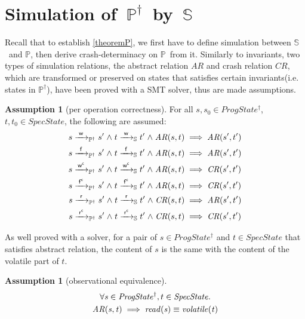 \documentclass[letterpaper,twocolumn,10pt]{article}
\theoremstyle{definition}
\newtheorem{assumption}[theorem]{Assumption}
\newcommand{\conj}{\mathrel\land}
\newcommand{\awa}[2]{\hphantom{#1}\mathclap{#2}\hphantom{#1}} %
\renewcommand{\i}[1]{\ensuremath{\mathit{#1}}}
\newcommand{\Spec}{\ensuremath{\mathbb S}}
\newcommand{\Prog}{\ensuremath{\mathbb P}}
\newcommand{\ProgInv}{\ensuremath{\mathbb P^\dagger}}
\newcommand{\actw}{\mathsf w}
\newcommand{\actwc}{\mathsf w^\mathsf{c}}
\newcommand{\actf}{\mathsf f}
\newcommand{\actr}{\mathsf r}
\newcommand{\actfc}{\mathsf{f^c}}
\newcommand{\actrc}{\mathsf{r^c}}
\newcommand{\ttIn}[2]{\xrightarrow{#1}_{#2}}
\newcommand{\ttS}[1]{\ttIn{#1}{\Spec}}
\newcommand{\ttPI}[1]{\ttIn{#1}{\ProgInv}}
\begin{document}
\section{Simulation of~\ProgInv\ by~\Spec}
\label{sec:sim}
Recall that to establish \cref{theoremP}, we first have to define simulation between \Spec\ and \Prog, then derive crash-determinacy on \Prog\ from it. Similarly to invariants, two types of simulation relations, the abstract relation $\i{AR}$ and crash relation $\i{CR}$, which are transformed or preserved on states that satisfies certain invariants(i.e. states in \ProgInv), have been proved with a SMT solver, thus are made assumptions.
\begin{assumption}[per operation correctness]
	For all $s, s_0 \in \i{ProgState^\dagger}$, $t, t_0 \in \i{SpecState}$, the following are assumed:
\begin{align*}
s \ttPI{\awa{\actw}{\actw }} s' \conj t \ttS{\awa{\actw}{\actw }} t' \conj \i{AR}(s, t) &\implies \i{AR}(s', t')\\
s \ttPI{\awa{\actw}{\actf }} s' \conj t \ttS{\awa{\actw}{\actf }} t' \conj \i{AR}(s, t) &\implies \i{AR}(s', t')\\
s \ttPI{\awa{\actw}{\actwc}} s' \conj t \ttS{\awa{\actw}{\actwc}} t' \conj \i{AR}(s, t) &\implies \i{CR}(s', t')\\
s \ttPI{\awa{\actw}{\actfc}} s' \conj t \ttS{\awa{\actw}{\actfc}} t' \conj \i{AR}(s, t) &\implies \i{CR}(s', t')\\
s \ttPI{\awa{\actw}{\actr }} s' \conj t \ttS{\awa{\actw}{\actr }} t' \conj \i{CR}(s, t) &\implies \i{AR}(s', t')\\
s \ttPI{\awa{\actw}{\actrc}} s' \conj t \ttS{\awa{\actw}{\actrc}} t' \conj \i{CR}(s, t) &\implies \i{CR}(s', t')
\end{align*}
\end{assumption}
As well proved with a solver, for a pair of \i{s \in ProgState^\dagger} and \i{t \in SpecState} that satisfies abstract relation, the content of $s$ is the same with the content of the volatile part of $t$.
\begin{assumption}[observational equivalence]
	\begin{multline*}
	 \forall \i{s} \in \i{ProgState^\dagger},t \in \i{SpecState} \ldotp \\
	 \i{AR(s, t)} \implies \i{read(s)} \equiv \i{volatile(t)} \\
	\end{multline*}
\end{assumption}
\end{document}
